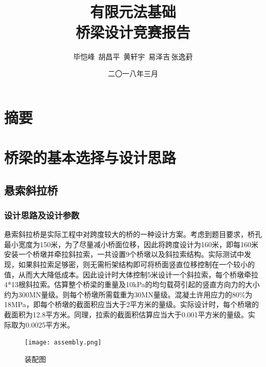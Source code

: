 \documentclass[forprint]{WHUBachelor}
\begin{document}



\title{\\有限元法基础\\桥梁设计竞赛报告}


\author{毕恺峰$\,$ 胡昌平$\,$ 黄轩宇 $\,$易泽吉$\,$张逸葑}                            %



\date{二〇一八年三月}                    %


\maketitle
\frontmatter
{}              %


\mainmatter %
\tableofcontents
\chapter{摘要}
\chapter{桥梁的基本选择与设计思路}
\section{悬索斜拉桥}
\subsection{设计思路及设计参数}
悬索斜拉桥是实际工程中对跨度较大的桥的一种设计方案。考虑到题目要求，桥孔最小宽度为150米，为了尽量减小桥面位移，因此将跨度设计为160米，即每160米安装一个桥墩并牵拉斜拉索，一共设置9个桥墩以及斜拉索结构。实际测试中发现，如果斜拉索足够密，则无需桁架结构即可将桥面竖直位移控制在一个较小的值，从而大大降低成本。因此设计时大体控制5米设计一个斜拉索，每个桥墩牵拉4*13根斜拉索。估算整个桥梁的重量及10kPa的均匀载荷引起的竖直方向力的大小约为300MN量级。则每个桥墩所需载重为30MN量级。混凝土许用应力的80\%为18MPa，即每个桥墩的截面积应当大于2平方米的量级。实际设计时，每个桥墩的截面积为12.8平方米。同理，拉索的截面积估算应当大于0.001平方米的量级。实际取为0.0025平方米。
\begin{figure}[H]
\centering  
\texttt{[image: assembly.png]} 
\caption{装配图} 
\label{3-1} 
\end{figure}
\end{document}
